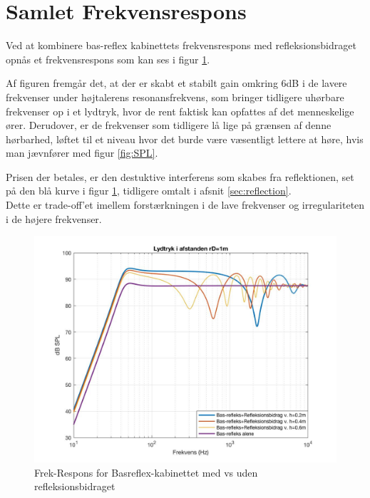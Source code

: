 \newpage


\section{Samlet Frekvensrespons}

Ved at kombinere bas-reflex kabinettets frekvensrespons med refleksionsbidraget opnås et frekvensrespons som kan ses i figur \ref{fig:sim_samletrespons}.

Af figuren fremgår det, at der er skabt et stabilt gain omkring 6dB i de lavere frekvenser under højtalerens resonansfrekvens, som bringer tidligere uhørbare frekvenser op i et lydtryk, hvor de rent faktisk kan opfattes af det menneskelige ører. Derudover, er de frekvenser som tidligere lå lige på grænsen af denne hørbarhed, løftet til et niveau hvor det burde være væsentligt lettere at høre, hvis man jævnfører med figur \ref{fig:SPL}.

Prisen der betales, er den destuktive interferens som skabes fra reflektionen, set på den blå kurve i figur \ref{fig:sim_samletrespons}, tidligere omtalt i afsnit \ref{sec:reflection}.\\
Dette er trade-off'et imellem forstærkningen i de lave frekvenser og irregulariteten i de højere frekvenser. 

\begin{figure}[h!]
	\centering
	\includegraphics[width=.73\textwidth]{Pics/sim_samletrespons2}
	\caption{Frek-Respons for Basreflex-kabinettet med vs uden refleksionsbidraget} 
	\label{fig:sim_samletrespons}
\end{figure}


